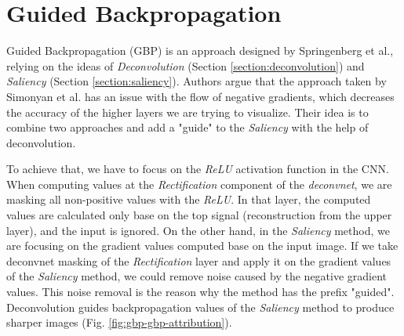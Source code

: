 \section{Guided Backpropagation}\label{section:gbp}

Guided Backpropagation (GBP) \cite{springenberg2014striving} is an approach designed by Springenberg et al., relying on the ideas of \textit{Deconvolution} (Section \ref{section:deconvolution}) and \textit{Saliency} (Section \ref{section:saliency}). Authors argue that the approach taken by Simonyan et al. \cite{simonyan2014deep} has an issue with the flow of negative gradients, which decreases the accuracy of the higher layers we are trying to visualize. Their idea is to combine two approaches and add a "guide" to the \textit{Saliency} with the help of deconvolution.

\vspace{\baselineskip}

To achieve that, we have to focus on the \textit{ReLU} activation function in the CNN. When computing values at the \textit{Rectification} component of the \textit{deconvnet}, we are masking all non-positive values with the \textit{ReLU}. In that layer, the computed values are calculated only base on the top signal (reconstruction from the upper layer), and the input is ignored. On the other hand, in the \textit{Saliency} method, we are focusing on the gradient values computed base on the input image. If we take deconvnet masking of the \textit{Rectification} layer and apply it on the gradient values of the \textit{Saliency} method, we could remove noise caused by the negative gradient values. This noise removal is the reason why the method has the prefix "guided". Deconvolution guides backpropagation values of the \textit{Saliency} method to produce sharper images (Fig. \ref{fig:gbp-gbp-attribution}).

